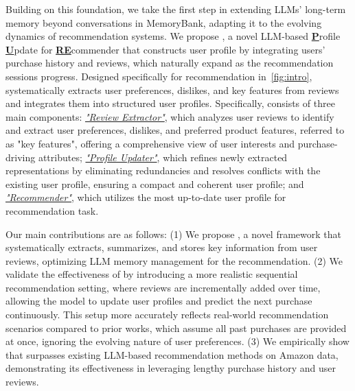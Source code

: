 Building on this foundation, we take the first step in extending LLMs' long-term memory beyond conversations in MemoryBank, adapting it to the evolving dynamics of recommendation systems.
%
We propose \myalg{}, a novel LLM-based \underline{\textbf{P}}rofile \underline{\textbf{U}}pdate for \underline{\textbf{RE}}commender that constructs user profile by integrating users' purchase history and reviews, which naturally expand as the recommendation sessions progress. Designed specifically for recommendation in~\autoref{fig:intro}, \myalg{} systematically extracts user preferences, dislikes, and key features from reviews and integrates them into structured user profiles.
%
Specifically, \myalg{} consists of three main components: \underline{\emph{"Review Extractor"}}, which analyzes user reviews to identify and extract user preferences, dislikes, and preferred product features, referred to as "key features", offering a comprehensive view of user interests and purchase-driving attributes; \underline{\emph{"Profile Updater"}}, which refines newly extracted representations by eliminating redundancies and resolves conflicts with the existing user profile, ensuring a compact and coherent user profile; and \underline{\emph{"Recommender"}}, which utilizes the most up-to-date user profile for  recommendation task. %

Our main contributions are as follows: 
(1) We propose \myalg{}, a novel framework that systematically extracts, summarizes, and stores key information from user reviews, optimizing LLM memory management for the recommendation. %
(2) We validate the effectiveness of \myalg{} by introducing a more realistic sequential recommendation setting, where reviews are incrementally added over time, allowing the model to update user profiles and predict the next purchase continuously. This setup more accurately reflects real-world recommendation scenarios compared to prior works, which assume all past purchases are provided at once, ignoring the evolving nature of user preferences. 
(3) We empirically show that \myalg{} surpasses existing LLM-based recommendation methods on Amazon data, demonstrating its effectiveness in leveraging lengthy purchase history and user reviews.


